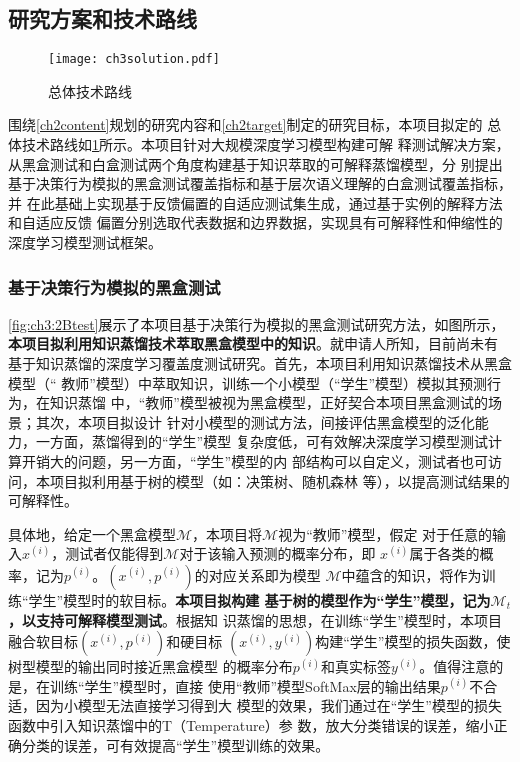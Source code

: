 \subsection{研究方案和技术路线}

\begin{figure}[h]
    \begin{small}
        \begin{center}
            \texttt{[image: ch3solution.pdf]}
        \end{center}
        \caption{总体技术路线}
        \label{fig:ch3:solution}
    \end{small}
\end{figure}

围绕\ref{ch2content}规划的研究内容和\ref{ch2target}制定的研究目标，本项目拟定的
总体技术路线如\cref{fig:ch3:solution}所示。本项目针对大规模深度学习模型构建可解
释测试解决方案，从黑盒测试和白盒测试两个角度构建基于知识萃取的可解释蒸馏模型，分
别提出基于决策行为模拟的黑盒测试覆盖指标和基于层次语义理解的白盒测试覆盖指标，并
在此基础上实现基于反馈偏置的自适应测试集生成，通过基于实例的解释方法和自适应反馈
偏置分别选取代表数据和边界数据，实现具有可解释性和伸缩性的深度学习模型测试框架。



\subsubsection{基于决策行为模拟的黑盒测试}\label{ch3_1}

\cref{fig:ch3:2Btest}展示了本项目基于决策行为模拟的黑盒测试研究方法，如图所示，
\textbf{本项目拟利用知识蒸馏技术萃取黑盒模型中的知识}。就申请人所知，目前尚未有
基于知识蒸馏的深度学习覆盖度测试研究。首先，本项目利用知识蒸馏技术从黑盒模型（``
教师''模型）中萃取知识，训练一个小模型（``学生''模型）模拟其预测行为，在知识蒸馏
中，``教师''模型被视为黑盒模型，正好契合本项目黑盒测试的场景；其次，本项目拟设计
针对小模型的测试方法，间接评估黑盒模型的泛化能力，一方面，蒸馏得到的``学生''模型
复杂度低，可有效解决深度学习模型测试计算开销大的问题，另一方面，``学生''模型的内
部结构可以自定义，测试者也可访问，本项目拟利用基于树的模型（如：决策树、随机森林
等），以提高测试结果的可解释性。

具体地，给定一个黑盒模型$\mathcal M$，本项目将$\mathcal M$视为``教师''模型，假定
对于任意的输入$x^{(i)}$，测试者仅能得到$\mathcal M$对于该输入预测的概率分布，即
$x^{(i)}$属于各类的概率，记为$p^{(i)}$。$(x^{(i)}, p^{(i)})$的对应关系即为模型
$\mathcal M$中蕴含的知识，将作为训练``学生''模型时的软目标。\textbf{本项目拟构建
基于树的模型作为``学生''模型，记为$\mathcal M_t$，以支持可解释模型测试}。根据知
识蒸馏的思想，在训练``学生''模型时，本项目融合软目标$(x^{(i)}, p^{(i)})$和硬目标
$(x^{(i)}, y^{(i)})$构建``学生''模型的损失函数，使树型模型的输出同时接近黑盒模型
的概率分布$p^{(i)}$和真实标签$y^{(i)}$。值得注意的是，在训练``学生''模型时，直接
使用``教师''模型SoftMax层的输出结果$p^{(i)}$不合适，因为小模型无法直接学习得到大
模型的效果，我们通过在``学生''模型的损失函数中引入知识蒸馏中的T（Temperature）参
数，放大分类错误的误差，缩小正确分类的误差，可有效提高``学生''模型训练的效果。

